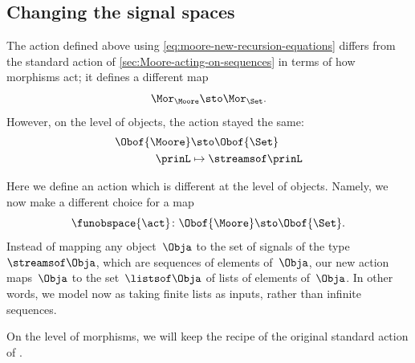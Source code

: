 {

\subsection{Changing the signal spaces}

The action defined above using \cref{eq:moore-new-recursion-equations} differs from the standard action of \cref{sec:Moore-acting-on-sequences} in terms of how morphisms act; it defines a different map
\begin{equation}
    \Mor_\Moore \sto \Mor_\Set.
\end{equation}
However, on the level of objects, the action stayed the same:
\begin{equation}
    \begin{aligned}
        \Obof{\Moore} & \sto \Obof{\Set} \\
        \prinL        & \mapsto \streamsof\prinL
    \end{aligned}
\end{equation}

Here we define an action which is different at the level of objects.
Namely, we now make a different choice for a map
\begin{equation}
    \funobspace{\act} \colon \Obof{\Moore} \sto \Obof{\Set}.
\end{equation}
Instead of mapping any object~$\Obja$ to the set of signals of the type~$\streamsof\Obja$, which are sequences of elements of~$\Obja$, our new action maps~$\Obja$ to the set~$\listsof\Obja$ of lists of elements of~$\Obja$.
In other words, we model  now as taking finite lists as inputs, rather than infinite sequences.

On the level of morphisms, we will keep the recipe of the original standard action of .

}
